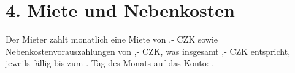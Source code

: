 \section*{4. Miete und Nebenkosten}
Der Mieter zahlt monatlich eine Miete von \Rentrentamount,- CZK sowie Nebenkostenvorauszahlungen von \Rentservicesamount,- CZK, was insgesamt \Renttotalamount,- CZK entspricht, jeweils fällig bis zum \Rentpaymentday. Tag des Monats auf das Konto: \Rentbankaccount.
